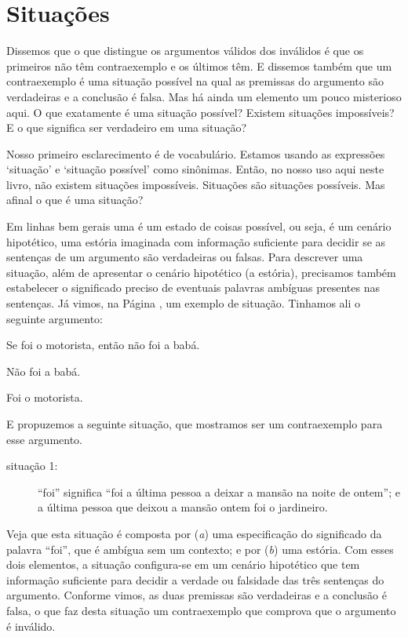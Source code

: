 \section{Situações}
\label{ss:Validade}
Dissemos que o que distingue os argumentos válidos dos inválidos é que os primeiros não têm contraexemplo e os últimos têm.
E dissemos também que um contraexemplo é uma situação possível na qual as premissas do argumento são verdadeiras e a conclusão é falsa. 
Mas há ainda um elemento um pouco misterioso aqui.
O que exatamente é uma situação possível?
Existem situações impossíveis?
E o que significa ser verdadeiro em uma situação?

Nosso primeiro esclarecimento é de vocabulário.
Estamos usando as expressões `situação' e `situação possível' como sinônimas.
Então, no nosso uso aqui neste livro, não existem situações impossíveis.
Situações são situações possíveis.
Mas afinal o que é uma situação?

Em linhas bem gerais uma  é um estado de coisas possível, ou seja, é um cenário hipotético, uma estória imaginada com informação suficiente para decidir se as sentenças de um argumento são verdadeiras ou falsas.
Para descrever uma situação, além de apresentar o cenário hipotético (a estória), precisamos também estabelecer o significado preciso de eventuais palavras ambíguas presentes nas sentenças.
Já vimos, na Página \pageref{contraexemplo}, um exemplo de situação. %
Tinhamos ali o seguinte argumento:
 
 \begin{earg}
 	\item[] Se foi o motorista, então não foi a babá.
 	\item[] Não foi a babá.
 	\item[\therefore] Foi o motorista.
 \end{earg}
E propuzemos a seguinte situação, que mostramos ser um contraexemplo para esse argumento.

\begin{description}
	\item[situação 1:] ``foi'' significa ``foi a última pessoa a deixar a mansão na noite de ontem''; e a última pessoa que deixou a mansão ontem foi o jardineiro.
\end {description}
Veja que esta situação é composta por (\textit{a}) uma especificação do significado da palavra ``foi'', que é ambígua sem um contexto; e por (\textit{b}) uma estória.
Com esses dois elementos, a situação configura-se em um cenário hipotético que tem informação suficiente para decidir a verdade ou falsidade das três sentenças do argumento.
Conforme vimos, as duas premissas são verdadeiras e a conclusão é falsa, o que faz desta situação um contraexemplo que comprova que o argumento é inválido.

